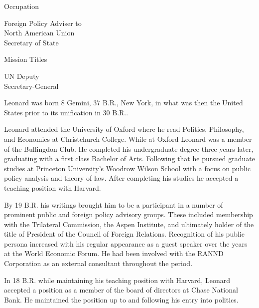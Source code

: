 {        \bTR
            \bTC Occupation \eTC
            \bTC 
                \startitemize[4]
                \startpacked
                \item Foreign Policy Adviser to\\North American Union\\Secretary of State
                \stoppacked
                \stopitemize
            \eTC
        \eTR
        
        \bTR
            \bTC Mission Titles \eTC
            \bTC 
                \startitemize[4]
                \startpacked
                \item UN Deputy\\Secretary-General
                \stoppacked
                \stopitemize
            \eTC            
        \eTR
    \eTABLEbody

\eTABLE
}

Leonard was born 8 Gemini, 37 B.R., New York, in what was then the United States prior to its unification in 30 B.R..

Leonard attended the University of Oxford where he read Politics, Philosophy, and Economics at Christchurch College. While at Oxford Leonard was a member of the Bullingdon Club. He completed his undergraduate degree three years later, graduating with a first class Bachelor of Arts. Following that he pursued graduate studies at Princeton University's Woodrow Wilson School with a focus on public policy analysis and theory of law. After completing his studies he accepted a teaching position with Harvard.

By 19 B.R. his writings brought him to be a participant in a number of prominent public and foreign policy advisory groups. These included membership with the Trilateral Commission, the Aspen Institute, and ultimately holder of the title of President of the Council of Foreign Relations. Recognition of his public persona increased with his regular appearance as a guest speaker over the years at the World Economic Forum. He had been involved with the RANND Corporation as an external consultant throughout the period.

In 18 B.R. while maintaining his teaching position with Harvard, Leonard accepted a position as a member of the board of directors at Chase National Bank. He maintained the position up to and following his entry into politics.

